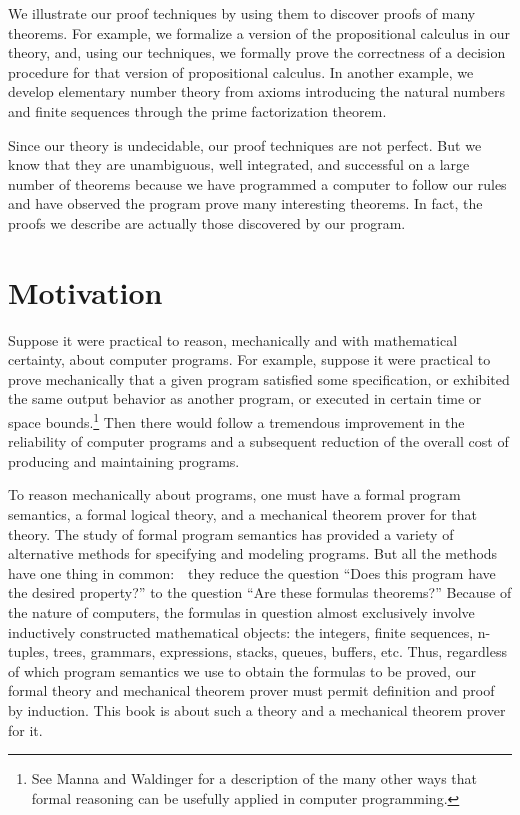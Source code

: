 \documentclass[11pt]{book}
\newcommand{\pubdefaulttextsize}{\large}
\begin{document}
We illustrate our proof techniques by using them to discover proofs
of many theorems.  For example, we formalize a version of
the propositional calculus in our theory, and, using our techniques, we
formally prove the correctness of a decision procedure
for that version of propositional calculus.
In another example, we develop elementary number theory from axioms
introducing the natural numbers and finite sequences through
the prime factorization theorem.

Since our theory is undecidable, our proof techniques are
not perfect.  But we know that they are unambiguous, well integrated,
and successful on a large number of theorems because we have programmed
a computer to follow our rules and have observed the program prove
many interesting theorems.  In fact, the proofs we describe are actually
those discovered by our program.
\section{Motivation}
\pubdefaulttextsize
Suppose it were practical to reason, mechanically and with mathematical
certainty, about computer programs.  For example, suppose it were practical
to prove mechanically that a given program satisfied some specification, or
exhibited the same output behavior as another program, or
executed in certain time or space bounds.\footnote{See Manna and Waldinger \cite{MW} for a description of the many other ways that formal reasoning can be usefully applied in computer programming.}
Then there would follow a tremendous improvement in the reliability of
computer programs and a subsequent reduction of the overall cost of
producing and maintaining programs.

To reason mechanically about programs, one must have a formal program
semantics, a formal logical theory, and a mechanical theorem prover for that
theory.
The study of formal program semantics
has provided a variety of alternative methods for specifying and
modeling programs.  But all the methods have one thing in common:~~they
reduce the question ``Does this program have the desired property?''
to the question ``Are these formulas theorems?''  Because of the
nature of computers, the formulas in question almost
exclusively involve inductively constructed mathematical objects:  the integers,
finite sequences, n-tuples, trees, grammars, expressions, stacks, queues, buffers,
etc.  Thus, regardless of which program semantics
we use to obtain the formulas to be proved, our formal theory and
mechanical theorem prover must permit
definition and proof by induction.
This book is
about such a theory and a mechanical theorem prover for it.
\end{document}
